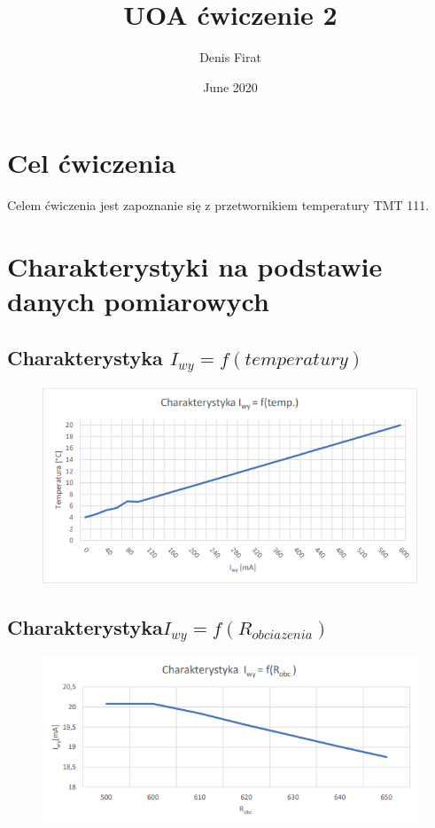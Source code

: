 \documentclass{article}
\title{UOA ćwiczenie 2}
\author{Denis Firat}
\date{June 2020}
\begin{document}
\maketitle

\section{Cel ćwiczenia}
Celem ćwiczenia jest zapoznanie się z przetwornikiem temperatury TMT 111.

\section{Charakterystyki na podstawie danych pomiarowych}
\subsection{Charakterystyka $I_{wy}=f(temperatury)$}
\begin{figure}[h!]
    \centering
    \includegraphics{cw2.png}
    \label{fig:my_label}
\end{figure}\newpage
\subsection{Charakterystyka$I_{wy}=f(R_{obciazenia})$ }
\begin{figure}[h]
    \centering
    \includegraphics{cw21.png}
    \label{fig:my_label}
\end{figure}
\end{document}
